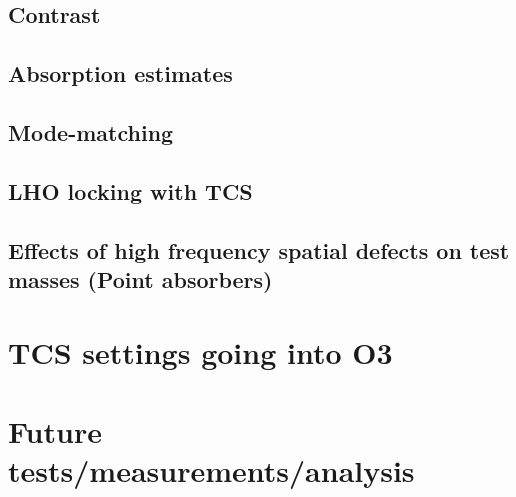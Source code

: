 \documentclass{article}
\begin{document}
	\subsection{Contrast}
		
	\subsection{Absorption estimates}
		
	\subsection{Mode-matching}
		
	\subsection{LHO locking with TCS}
		     
	\subsection{Effects of high frequency spatial defects on test masses (Point absorbers)}
		

\section{TCS settings going into O3}
	

\section{Future tests/measurements/analysis}
	
\end{document}
